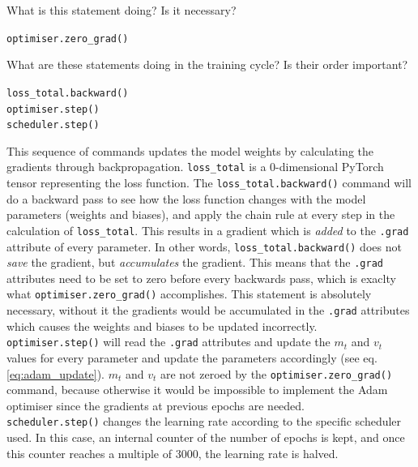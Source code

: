 \documentclass[we,twoside,openright,a4paper,11pt]{uantwerpenbamathesis}
\begin{document}
\begin{tcolorbox}[title=Questions 5 and 6, colback=blue!10!white, colframe=blue!40!white, sharp corners]
    What is this statement doing? Is it necessary?
    \begin{tcolorbox}[colback=gray!10!white, colframe=gray!40!white]
        \verb|optimiser.zero_grad()|
    \end{tcolorbox}
    What are these statements doing in the training cycle? Is their order important?
    \begin{tcolorbox}[colback=gray!10!white, colframe=gray!40!white]
        \verb|loss_total.backward()|\\
        \verb|optimiser.step()|\\
        \verb|scheduler.step()|
    \end{tcolorbox}
\end{tcolorbox}
This sequence of commands updates the model weights by calculating the gradients through backpropagation. \verb|loss_total| is a $0$-dimensional PyTorch tensor representing the loss function. The \verb|loss_total.backward()| command will do a backward pass to see how the loss function changes with the model parameters (weights and biases), and apply the chain rule at every step in the calculation of \verb|loss_total|. This results in a gradient which is \textit{added} to the \verb|.grad| attribute of every parameter. In other words, \verb|loss_total.backward()| does not \textit{save} the gradient, but \textit{accumulates} the gradient. This means that the \verb|.grad| attributes need to be set to zero before every backwards pass, which is exaclty what \verb|optimiser.zero_grad()| accomplishes. This statement is absolutely necessary, without it the gradients would be accumulated in the \verb|.grad| attributes which causes the weights and biases to be updated incorrectly.\\

\verb|optimiser.step()| will read the \verb|.grad| attributes and update the $m_t$ and $v_t$ values for every parameter and update the parameters accordingly (see eq. \ref{eq:adam_update}). $m_t$ and $v_t$ are not zeroed by the \verb|optimiser.zero_grad()| command, because otherwise it would be impossible to implement the Adam optimiser since the gradients at previous epochs are needed.\\

\verb|scheduler.step()| changes the learning rate according to the specific scheduler used. In this case, an internal counter of the number of epochs is kept, and once this counter reaches a multiple of $3000$, the learning rate is halved.\\
\end{document}

